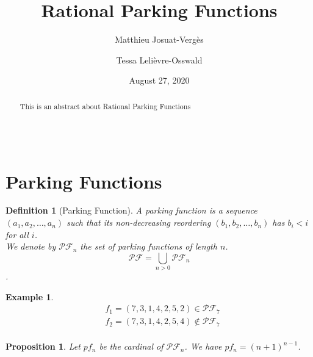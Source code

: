 \documentclass[12pt]{article}
\newtheorem*{prop}{Proposition}
\newtheorem{definition}{Definition}
\newtheorem*{example}{Example}
\begin{document}
\title{Rational Parking Functions}
\author{Matthieu Josuat-Vergès \and Tessa Lelièvre-Osswald}
\date{August 27, 2020}

\maketitle

\begin{abstract}
    This is an abstract about Rational Parking Functions
\end{abstract}

\begin{displaymath}
\end{displaymath}

\section{Parking Functions}

\begin{definition}[Parking Function]
    A \emph{parking function} is a sequence $(a_1, a_2, \ldots, a_n)$
    such that its non-decreasing reordering $(b_1, b_2, \ldots, b_n)$
    has $b_i < i$ for all $i$.\\
    We denote by $\mathcal{PF}_n$ the set of parking functions of length $n$.
    $$\mathcal{PF} = \bigcup_{n > 0}{\mathcal{PF}_n}$$.
\end{definition}

\begin{example}
    \begin{align*}
    &f_1 = (7, 3, 1, 4, 2, 5, 2) \in \mathcal{PF}_7\\
    &f_2 = (7, 3, 1, 4, 2, 5, 4) \notin \mathcal{PF}_7\\
    \end{align*}
\end{example}

\begin{prop}
    Let $pf_n$ be the cardinal of $\mathcal{PF}_n$.
    We have $pf_n = (n + 1)^{n-1}$.
\end{prop}
\end{document}

